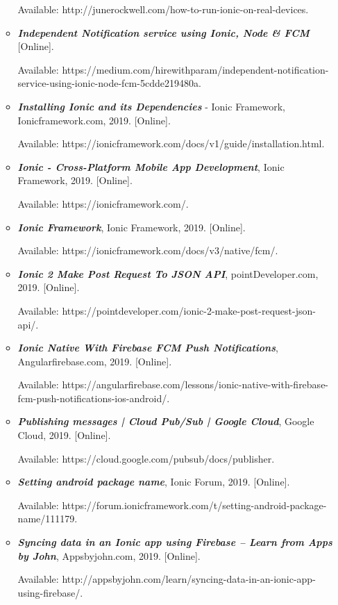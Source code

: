 \documentclass[12pt, a4paper]{report}
\begin{document}
\begin{itemize}
\begin{itemize}
        Available: http://junerockwell.com/how-to-run-ionic-on-real-devices. 
        \item\textit{\textbf{Independent Notification service using Ionic, Node & FCM}} [Online]. 
        
        Available: https://medium.com/hirewithparam/independent-notification-service-using-ionic-node-fcm-5cdde219480a. 
        \item\textit{\textbf{Installing Ionic and its Dependencies}} - Ionic Framework, Ionicframework.com, 2019. [Online]. 
        
        Available: https://ionicframework.com/docs/v1/guide/installation.html. 
        \item\textit{\textbf{Ionic - Cross-Platform Mobile App Development}}, Ionic Framework, 2019. [Online]. 
        
        Available: https://ionicframework.com/. 
        \item\textit{\textbf{Ionic Framework}}, Ionic Framework, 2019. [Online]. 
        
        Available: https://ionicframework.com/docs/v3/native/fcm/. 
        \item\textit{\textbf{Ionic 2 Make Post Request To JSON API}}, pointDeveloper.com, 2019. [Online]. 
        
        Available: https://pointdeveloper.com/ionic-2-make-post-request-json-api/. 
        \item\textit{\textbf{Ionic Native With Firebase FCM Push Notifications}}, Angularfirebase.com, 2019. [Online]. 
        
    
        Available: https://angularfirebase.com/lessons/ionic-native-with-firebase-fcm-push-notifications-ios-android/. 
        \item\textit{\textbf{Publishing messages  |  Cloud Pub/Sub  |  Google Cloud}}, Google Cloud, 2019. [Online]. 
        
        Available: https://cloud.google.com/pubsub/docs/publisher. 
        \item\textit{\textbf{Setting android package name}}, Ionic Forum, 2019. [Online].
        
        Available: https://forum.ionicframework.com/t/setting-android-package-name/111179. 
        \item\textit{\textbf{Syncing data in an Ionic app using Firebase – Learn from Apps by John}}, Appsbyjohn.com, 2019. [Online]. 
        
        Available: http://appsbyjohn.com/learn/syncing-data-in-an-ionic-app-using-firebase/. 
    \end{itemize}
    

\end{itemize}
\end{document}
